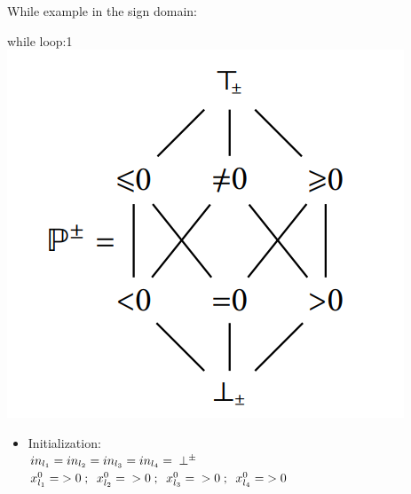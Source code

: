 \begin{frame}{While example in the sign domain:}
\begin{exampleblock}{while loop:1}
	\centering 
	\centering \includegraphics[scale=0.60]{content/images/static-analysis/sign1.png}
	
	\begin{itemize}
		\item Initialization: 
			\\ $\scriptsize in_{l_1}=in_{l_2}=in_{l_3}=in_{l_4}=~\bot^{\pm}$
			\\ $\scriptsize x_{l_1}^0 =~>0~;~~x_{l_2}^0 =~~>0~;~~x_{l_3}^0 =~~>0~;~~x_{l_4}^0 =~>0~~$
			
		\end{itemize}
\end{exampleblock}
\end{frame}

